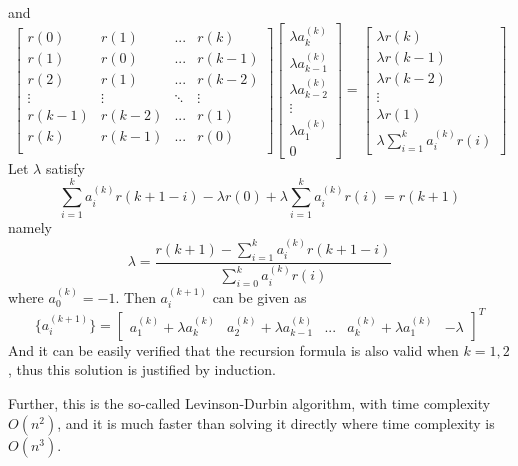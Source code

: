 \documentclass[preprint,12pt]{elsarticle}
\begin{document}
and
\begin{equation}
	\begin{bmatrix}
		r(0) & r(1) & ... & r(k)\\ 
		r(1) & r(0) & ... & r(k-1)\\
		r(2) & r(1) & ... & r(k-2)\\
		\vdots & \vdots & \ddots & \vdots \\
		r(k-1) & r(k-2) & ... & r(1)\\
		r(k) & r(k-1) & ... & r(0)\\
	\end{bmatrix}
	\begin{bmatrix}
		\lambda a_k^{(k)} \\
		\lambda a_{k-1}^{(k)} \\
		\lambda a_{k-2}^{(k)} \\
		\vdots \\
		\lambda a_1^{(k)} \\
		0
	\end{bmatrix}
	=
	\begin{bmatrix}
		\lambda r(k) \\
		\lambda r(k-1) \\
		\lambda r(k-2) \\
		\vdots \\
		\lambda r(1) \\
		\lambda\sum_{i=1}^{k}a_i^{(k)} r(i)
	\end{bmatrix}
\end{equation}
Let $\lambda$ satisfy
\begin{equation}
	\sum_{i=1}^{k}a_i^{(k)} r(k+1-i)-\lambda r(0) + \lambda\sum_{i=1}^{k}a_i^{(k)} r(i) = r(k+1)
\end{equation}
namely
\begin{equation}
	\lambda = \frac{r(k+1) - \sum_{i=1}^{k}a_i^{(k)} r(k+1-i)}{\sum_{i=0}^{k}a_i^{(k)}r(i)}
\end{equation}
where $a_0^{(k)} = -1$. Then $a_i^{(k+1)}$ can be given as
\begin{equation}
	\{a_i^{(k+1)}\} = 
	\begin{bmatrix}
		a_1^{(k)} + \lambda a_k^{(k)} & a_2^{(k)} + \lambda a_{k-1}^{(k)} & ... & a_k^{(k)} + \lambda a_1^{(k)} & -\lambda  
	\end{bmatrix}^T
\end{equation}
And it can be easily verified that the recursion formula is also valid when $k=1,2$, thus this solution is justified by induction. 

Further, this is the so-called Levinson-Durbin algorithm, with time complexity $O(n^2)$, and it is much faster than solving it directly where time complexity is $O(n^3)$.
\end{document}
